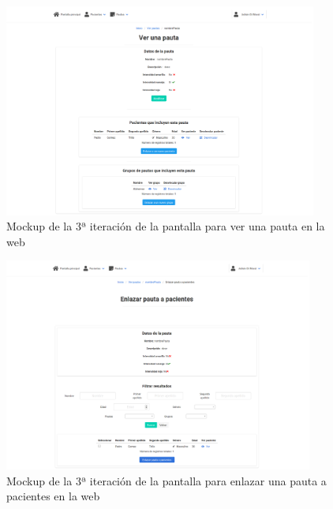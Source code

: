 \begin{figure}[H]
    \centering
    \includegraphics[height=7cm, width=\textwidth]{Imagenes/04DescProblema/mockups/v3/web/11-verPauta.png}
    \caption[Mockup de la 3ª iteración de la pantalla para ver una pauta en la web]{Mockup de la 3ª iteración de la pantalla para ver una pauta en la web}
    \label{c4:fig:v3:web:verPauta}
\end{figure}

\begin{figure}[H]
    \centering
    \includegraphics[height=7cm, width=\textwidth]{Imagenes/04DescProblema/mockups/v3/web/11-verPauta-enlazarPaciente.png}
    \caption[Mockup de la 3ª iteración de la pantalla para enlazar una pauta a pacientes en la web]{Mockup de la 3ª iteración de la pantalla para enlazar una pauta a pacientes en la web}
    \label{c4:fig:v3:web:enlazarPautaPacientes}
\end{figure}

